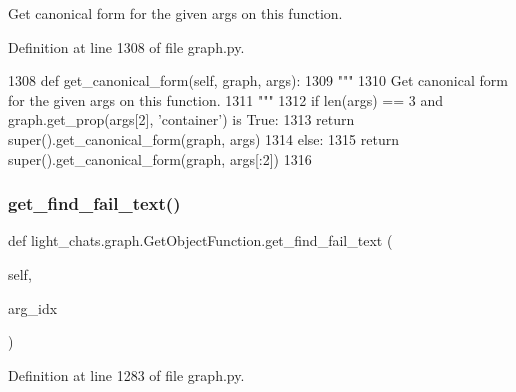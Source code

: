 \begin{DoxyVerb}Get canonical form for the given args on this function.
\end{DoxyVerb}
 

Definition at line 1308 of file graph.\+py.


\begin{DoxyCode}
1308     \textcolor{keyword}{def }get\_canonical\_form(self, graph, args):
1309         \textcolor{stringliteral}{"""}
1310 \textcolor{stringliteral}{        Get canonical form for the given args on this function.}
1311 \textcolor{stringliteral}{        """}
1312         \textcolor{keywordflow}{if} len(args) == 3 \textcolor{keywordflow}{and} graph.get\_prop(args[2], \textcolor{stringliteral}{'container'}) \textcolor{keywordflow}{is} \textcolor{keyword}{True}:
1313             \textcolor{keywordflow}{return} super().get\_canonical\_form(graph, args)
1314         \textcolor{keywordflow}{else}:
1315             \textcolor{keywordflow}{return} super().get\_canonical\_form(graph, args[:2])
1316 
\end{DoxyCode}
\mbox{\label{classlight__chats_1_1graph_1_1GetObjectFunction_a257db456e6c73645523f4ad9bd5ff918}} 
\subsubsection{\texorpdfstring{get\+\_\+find\+\_\+fail\+\_\+text()}{get\_find\_fail\_text()}}
{\footnotesize\ttfamily def light\+\_\+chats.\+graph.\+Get\+Object\+Function.\+get\+\_\+find\+\_\+fail\+\_\+text (\begin{DoxyParamCaption}\item[{}]{self,  }\item[{}]{arg\+\_\+idx }\end{DoxyParamCaption})}



Definition at line 1283 of file graph.\+py.


